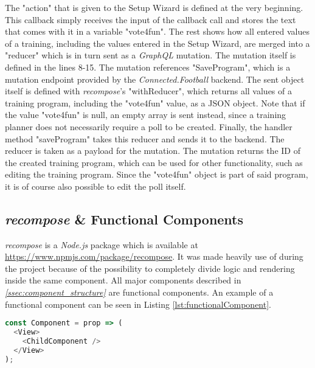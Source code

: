 The "action" that is given to the Setup Wizard is defined at the very beginning. This callback simply receives the input of the callback call and stores the text that comes with it in a variable "vote4fun". The rest shows how all entered values of a training, including the values entered in the Setup Wizard, are merged into a "reducer" which is in turn sent as a \textit{GraphQL} mutation.
\newline
The mutation itself is defined in the lines 8-15. The mutation references "SaveProgram", which is a mutation endpoint provided by the \textit{Connected.Football} backend. The sent object itself is defined with \textit{recompose}'s "withReducer", which returns all values of a training program, including the "vote4fun" value, as a JSON object. Note that if the value "vote4fun" is null, an empty array is sent instead, since a training planner does not necessarily require a poll to be created.
\newline
Finally, the handler method "saveProgram" takes this reducer and sends it to the backend. The reducer is taken as a payload for the mutation. The mutation returns the ID of the created training program, which can be used for other functionality, such as editing the training program. Since the "vote4fun" object is part of said program, it is of course also possible to edit the poll itself.

\subsection{\textit{recompose} \& Functional Components}
\label{ssec:recompose}

\textit{recompose} is a \textit{Node.js} package which is available at \url{https://www.npmjs.com/package/recompose}. It was made heavily use of during the project because of the possibility to completely divide logic and rendering inside the same component. All major components described in \textit{\ref{ssec:component_structure} } are functional components. An example of a functional component can be seen in Listing \ref{lst:functionalComponent}.

\begin{lstlisting}[language=javascript,caption=Functional Component Example,label=lst:functionalComponent]
const Component = prop => (
  <View>
    <ChildComponent />
  </View>
);
\end{lstlisting}

